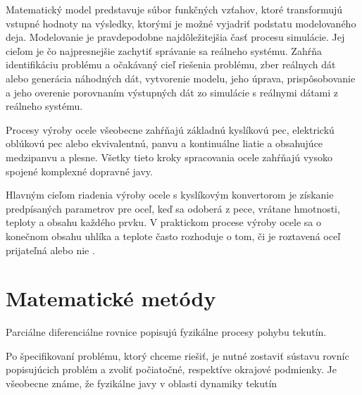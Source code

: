 \documentclass[]{tukediphc}
\begin{document}

Matematický model predstavuje súbor funkčných vzťahov, ktoré transformujú vstupné hodnoty na výsledky, ktorými je možné vyjadriť podstatu modelovaného deja. Modelovanie je pravdepodobne najdôležitejšia časť procesu simulácie. Jej cieľom je čo najpresnejšie zachytiť správanie sa reálneho systému. Zahŕňa identifikáciu problému a očakávaný cieľ riešenia problému, zber reálnych dát alebo generácia náhodných dát, vytvorenie modelu, jeho úprava, prispôsobovanie a jeho overenie porovnaním výstupných dát zo simulácie s reálnymi dátami z reálneho systému.

Procesy výroby ocele všeobecne zahŕňajú základnú kyslíkovú pec, elektrickú oblúkovú pec alebo ekvivalentnú, panvu a kontinuálne liatie a obsahujúce medzipanvu a plesne. Všetky tieto kroky spracovania ocele zahŕňajú vysoko spojené komplexné dopravné javy.

Hlavným cieľom riadenia výroby ocele s kyslíkovým konvertorom je získanie predpísaných parametrov pre oceľ, keď sa odoberá z pece, vrátane hmotnosti, teploty a obsahu každého prvku. V praktickom procese výroby ocele sa o konečnom obsahu uhlíka a teplote často rozhoduje o tom, či je roztavená oceľ prijateľná alebo nie \cite{Wang2010}.


\section{Matematické metódy}

Parciálne diferenciálne rovnice popisujú fyzikálne procesy pohybu tekutín.

Po špecifikovaní problému, ktorý chceme riešiť, je nutné zostaviť sústavu rovníc popisujúcich problém a zvoliť počiatočné, respektíve okrajové podmienky. Je všeobecne známe, že fyzikálne javy v oblasti dynamiky tekutín
\end{document}
